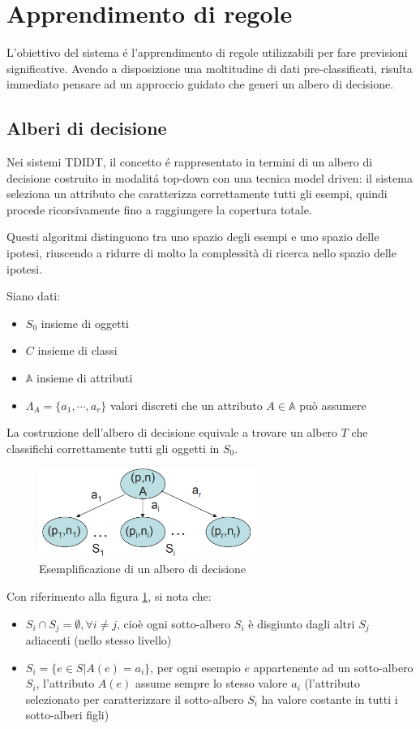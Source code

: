\documentclass[preprint]{acm_proc_article-sp}
\begin{document}
\section{Apprendimento di regole}
L'obiettivo del sistema \'e l'apprendimento di regole utilizzabili per fare previsioni significative. Avendo a disposizione una moltitudine di dati pre-classificati, risulta immediato pensare ad un approccio guidato che generi un albero di decisione.

\subsection{Alberi di decisione}
Nei sistemi TDIDT, il concetto \'e rappresentato in termini di un albero di decisione costruito in modalit\'a top-down con una tecnica model driven: il sistema seleziona un attributo che caratterizza correttamente tutti gli esempi, quindi procede ricorsivamente fino a raggiungere la copertura totale.

Questi algoritmi distinguono tra uno spazio degli esempi e uno spazio delle ipotesi, riuscendo a ridurre di molto la complessità di ricerca nello spazio delle ipotesi.

Siano dati:
\begin{itemize}
\item $S_0$ insieme di oggetti
\item $C$ insieme di classi
\item $\mathbb{A}$ insieme di attributi
\item $\Lambda_A=\lbrace a_1,\cdots,a_r \rbrace$ valori discreti che un attributo $A \in \mathbb{A}$ può assumere
\end{itemize}
La costruzione dell'albero di decisione equivale a trovare un albero $T$ che classifichi correttamente tutti gli oggetti in $S_0$.

\begin{figure}[!htb]
\centering
\includegraphics[width=200pt]{figures/decision-tree.png}
\caption{Esemplificazione di un albero di decisione}
\label{fig:albero-decisione}
\end{figure}

Con riferimento alla figura \ref{fig:albero-decisione}, si nota che:
\begin{itemize}
\item $S_i \cap S_j = \emptyset, \forall i \neq j$, cioè ogni sotto-albero $S_i$ è disgiunto dagli altri $S_j$ adiacenti (nello stesso livello)
\item $S_i= \lbrace e \in S | A(e) = a_i \rbrace$, per ogni esempio $e$ appartenente ad un sotto-albero $S_i$, l'attributo $A(e)$ assume sempre lo stesso valore $a_i$ (l'attributo selezionato per caratterizzare il sotto-albero $S_i$ ha valore costante in tutti i sotto-alberi figli)
\end{itemize}
\end{document}
